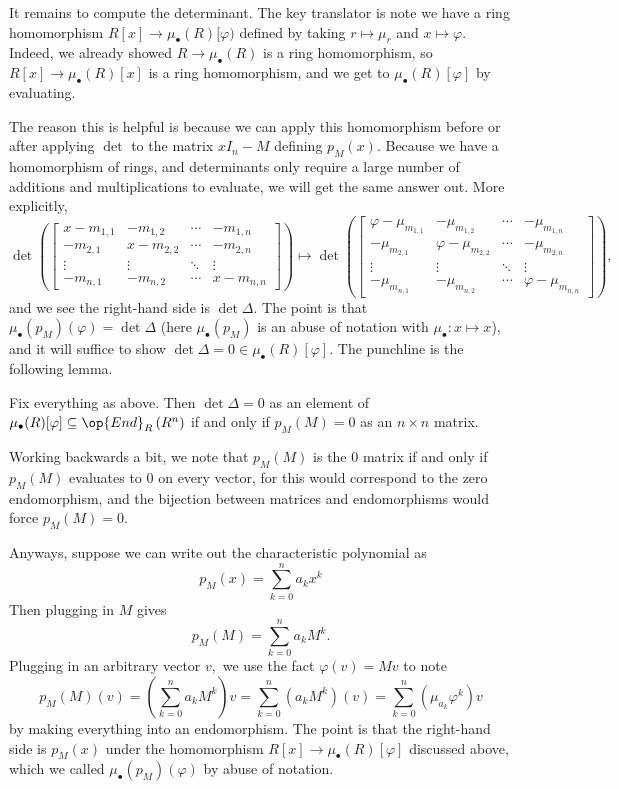 It remains to compute the determinant. The key translator is note we have a ring homomorphism $R[x]\to\mu_\bullet(R)[\varphi)$ defined by taking $r\mapsto\mu_r$ and $x\mapsto\varphi.$ Indeed, we already showed $R\to\mu_\bullet(R)$ is a ring homomorphism, so $R[x]\to\mu_\bullet(R)[x]$ is a ring homomorphism, and we get to $\mu_\bullet(R)[\varphi]$ by evaluating.

The reason this is helpful is because we can apply this homomorphism before or after applying $\det$ to the matrix $xI_n-M$ defining $p_M(x).$ Because we have a homomorphism of rings, and determinants only require a large number of additions and multiplications to evaluate, we will get the same answer out. More explicitly,
\[\det\left(\begin{bmatrix}
    x-m_{1,1} & -m_{1,2} & \cdots & -m_{1,n} \\
    -m_{2,1} & x-m_{2,2} & \cdots & -m_{2,n} \\
    \vdots & \vdots & \ddots & \vdots \\
    -m_{n,1} & -m_{n,2} & \cdots & x-m_{n,n}
\end{bmatrix}\right)\mapsto\det\left(\begin{bmatrix}
    \varphi-\mu_{m_{1,1}} & -\mu_{m_{1,2}} & \cdots & -\mu_{m_{1,n}} \\
    -\mu_{m_{2,1}} & \varphi-\mu_{m_{2,2}} & \cdots & -\mu_{m_{2,n}} \\
    \vdots & \vdots & \ddots & \vdots \\
    -\mu_{m_{n,1}} & -\mu_{m_{n,2}} & \cdots & \varphi-\mu_{m_{n,n}}
\end{bmatrix}\right),\]
and we see the right-hand side is $\det\Delta.$ The point is that $\mu_\bullet(p_M)(\varphi)=\det\Delta$ (here $\mu_\bullet(p_M)$ is an abuse of notation with $\mu_\bullet:x\mapsto x$), and it will suffice to show $\det\Delta=0\in\mu_\bullet(R)[\varphi].$ The punchline is the following lemma.
\begin{lemma}
    Fix everything as above. Then $\det\Delta=0$ as an element of $\mu_\bullet(R)[\varphi]\subseteq\op{End}_R\left(R^n\right)$ if and only if $p_M(M)=0$ as an $n\times n$ matrix.
\end{lemma}
Working backwards a bit, we note that $p_M(M)$ is the $0$ matrix if and only if $p_M(M)$ evaluates to $0$ on every vector, for this would correspond to the zero endomorphism, and the bijection between matrices and endomorphisms would force $p_M(M)=0.$

Anyways, suppose we can write out the characteristic polynomial as
\[p_M(x)=\sum_{k=0}^na_kx^k\]
Then plugging in $M$ gives
\[p_M(M)=\sum_{k=0}^na_kM^k.\]
Plugging in an arbitrary vector $v,$ we use the fact $\varphi(v)=Mv$ to note
\[p_M(M)(v)=\left(\sum_{k=0}^na_kM^k\right)v=\sum_{k=0}^n\left(a_kM^k\right)(v)=\sum_{k=0}^n\left(\mu_{a_k}\varphi^k\right)v\]
by making everything into an endomorphism. The point is that the right-hand side is $p_M(x)$ under the homomorphism $R[x]\to\mu_\bullet(R)[\varphi]$ discussed above, which we called $\mu_\bullet(p_M)(\varphi)$ by abuse of notation.

